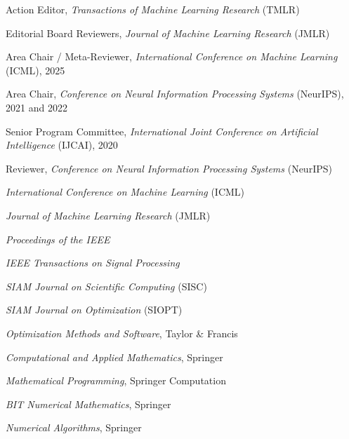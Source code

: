 \begin{innerlist}
\item[] Action Editor, \emph{Transactions of Machine Learning Research} (TMLR)
\item[] Editorial Board Reviewers, \emph{Journal of Machine Learning Research} (JMLR)
\item[] Area Chair / Meta-Reviewer, \emph{International Conference on Machine Learning} (ICML), 2025
\item[] Area Chair, \emph{Conference on Neural Information Processing Systems} (NeurIPS), 2021 and 2022
\item[] Senior Program Committee, \emph{International Joint Conference on Artificial Intelligence} (IJCAI), 2020
\item[] Reviewer, \emph{Conference on Neural Information Processing Systems} (NeurIPS)
\item[] \emph{International Conference on Machine Learning} (ICML)
\item[] \emph{Journal of Machine Learning Research} (JMLR)
\item[] \emph{Proceedings of the IEEE}
\item[] \emph{IEEE Transactions on Signal Processing}
\item[] \emph{SIAM Journal on Scientific Computing} (SISC)
\item[] \emph{SIAM Journal on Optimization} (SIOPT)
			\item[] \emph{Optimization Methods and Software}, Taylor \& Francis
			\item[] \emph{Computational and Applied Mathematics}, Springer
			\item[] \emph{Mathematical Programming}, Springer Computation
			\item[] \emph{BIT Numerical Mathematics}, Springer
			\item[] \emph{Numerical Algorithms}, Springer
		\end{innerlist}	
